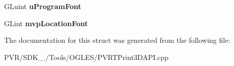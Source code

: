 \begin{DoxyCompactItemize}
\item 
\hypertarget{struct_s_p_v_r_t_print3_d_a_p_i_1_1_s_instance_data_acfaf618fd912ee9851005e76efb84753}{G\+Luint {\bfseries u\+Program\+Font}}\label{struct_s_p_v_r_t_print3_d_a_p_i_1_1_s_instance_data_acfaf618fd912ee9851005e76efb84753}

\item 
\hypertarget{struct_s_p_v_r_t_print3_d_a_p_i_1_1_s_instance_data_acfd6748479f3c3a0681bd2f2ab8023b7}{G\+Lint {\bfseries mvp\+Location\+Font}}\label{struct_s_p_v_r_t_print3_d_a_p_i_1_1_s_instance_data_acfd6748479f3c3a0681bd2f2ab8023b7}

\end{DoxyCompactItemize}


The documentation for this struct was generated from the following file\+:\begin{DoxyCompactItemize}
\item 
P\+V\+R/\+S\+D\+K\+\_./\+Tools/\+O\+G\+L\+E\+S/P\+V\+R\+T\+Print3\+D\+A\+P\+I.\+cpp\end{DoxyCompactItemize}
